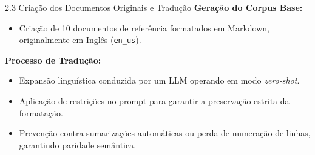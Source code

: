 \documentclass[aspectratio=169]{beamer}
\begin{document}
\begin{frame}{2.3 Criação dos Documentos Originais e Tradução}
    \textbf{Geração do Corpus Base:}
    \begin{itemize}
        \item Criação de 10 documentos de referência formatados em Markdown, originalmente em Inglês (\texttt{en\_us}).
    \end{itemize}
    
    \vspace{0.3cm}
    \textbf{Processo de Tradução:}
    \begin{itemize}
        \item Expansão linguística conduzida por um LLM operando em modo \textit{zero-shot}.
        \item Aplicação de restrições no prompt para garantir a preservação estrita da formatação.
        \item Prevenção contra sumarizações automáticas ou perda de numeração de linhas, garantindo paridade semântica.
    \end{itemize}
\end{frame}
\end{document}
